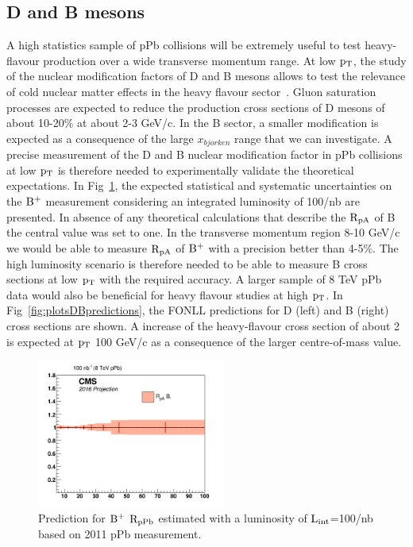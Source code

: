 \subsection{D and B mesons}
A high statistics sample of pPb collisions will be extremely useful to test heavy-flavour production over a wide transverse momentum range.
At low $\rm p_{T}$, the study of the nuclear modification factors of D and B mesons allows to test the relevance of cold nuclear matter effects in the 
heavy flavour sector~\cite{Eskola:2009uj,deFlorian:2003qf,Frankfurt:2011cs}. Gluon saturation processes are expected to reduce the production 
cross sections of D mesons of about 10-20$\%$ at about 2-3 GeV/c.  
In the B sector, a smaller modification is expected as a consequence of the large $x_{bjorken}$ range that we can investigate.
A precise measurement of the D and B nuclear modification factor in pPb collisions at low $\rm p_{T}$ is therefore needed to experimentally validate
the theoretical expectations. In Fig~\ref{fig:Bextrapolated}, the expected statistical and systematic uncertainties on the $\rm B^{+}$ measurement 
considering an integrated luminosity of 100/nb are presented. In absence of any theoretical calculations that describe the $\rm R_{pA}$
of B the central value was set to one. In the transverse momentum region 8-10 GeV/c we would be able to measure $\rm R_{pA}$ 
of $\rm B^{+}$ with a precision better than 4-5$\%$. The high luminosity scenario is therefore needed to be able to measure B cross sections at low 
 $\rm p_{T}$ with the required accuracy.
 A larger sample of 8 TeV pPb data would also be beneficial for heavy flavour studies at high $\rm p_{T}$.  In Fig~\ref{fig:plotsDBpredictions}, 
the FONLL predictions for D (left) and B (right) cross sections are shown. A  increase of the heavy-flavour cross section of about 2 is
expected at $\rm p_{T}~$100 GeV/c as a consequence of the larger centre-of-mass value. 

\begin{figure}[h]
\begin{center}
\includegraphics[width= 0.55\textwidth]{figures/BpPbprediction.jpg}
\caption{Prediction for $\rm B^{+}$ $\rm R_{pPb}$ estimated with a luminosity of $\rm L_{int}$=100/nb based on 2011 pPb measurement.}
\label{fig:Bextrapolated}
\end{center}
\end{figure}


